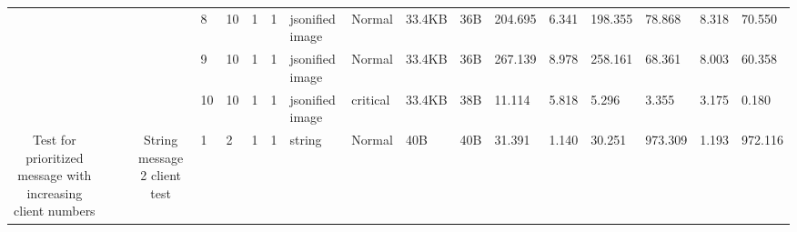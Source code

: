 \begin{landscape}
\begin{table}[]
{\begin{tabular}{@{}ccccllllllllllllll@{}}
                                                                                   &                              &                                &                                                                                                          & 8                                                     & 10                                       & 1                                          & 1                                 & jsonified image                  & Normal                             & 33.4KB                                        & 36B                                             & 204.695                 & 6.341    & 198.355                      & 78.868                  & 8.318    & 70.550                       \\
                                                                                   &                              &                                &                                                                                                          & 9                                                     & 10                                       & 1                                          & 1                                 & jsonified image                  & Normal                             & 33.4KB                                        & 36B                                             & 267.139                 & 8.978    & 258.161                      & 68.361                  & 8.003    & 60.358                       \\
                                                                                   &                              &                                &                                                                                                          & 10                                                    & 10                                       & 1                                          & 1                                 & jsonified image                  & critical                           & 33.4KB                                        & 38B                                             & 11.114                  & 5.818    & 5.296                        & 3.355                   & 3.175    & 0.180                        \\
    \multirow{124}{*}{Test for prioritized message with increasing client numbers} &                              &                                & \multirow{2}{*}{String message 2 client test}                                                            & 1                                                     & 2                                        & 1                                          & 1                                 & string                           & Normal                             & 40B                                           & 40B                                             & 31.391                  & 1.140    & 30.251                       & 973.309                 & 1.193    & 972.116                      \\

\end{tabular}}
\end{table}
\end{landscape}
